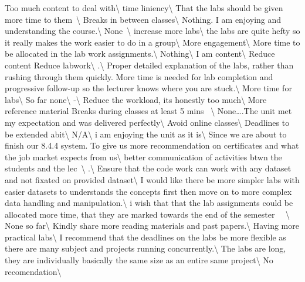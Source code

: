 \documentclass[
]{article}
\begin{document}
\hline Too much content to deal with\textbackslash{} \hline time
liniency\textbackslash{} \hline That the labs should be given more time
to them~\textbackslash{} \hline Breaks in between
classes\textbackslash{} \hline Nothing. I am enjoying and understanding
the course.\textbackslash{} \hline None~\textbackslash{} \hline increase
more labs\textbackslash{} \hline the labs are quite hefty so it really
makes the work easier to do in a group\textbackslash{} \hline More
engagement\textbackslash{} \hline More time to be allocated in the lab
work assignments.\textbackslash{} \hline Nothing\textbackslash{} \hline
I am content\textbackslash{} \hline Reduce content Reduce
labwork\textbackslash{} \hline .\textbackslash{} \hline Proper detailed
explanation of the labs, rather than rushing through them quickly. More
time is needed for lab completion and progressive follow-up so the
lecturer knows where you are stuck.\textbackslash{} \hline More time for
labs\textbackslash{} \hline So far none\textbackslash{} \hline
-\textbackslash{} \hline Reduce the workload, its honestly too
much\textbackslash{} \hline More reference material Breaks during
classes at least 5 mins ~\textbackslash{} \hline None\ldots.The unit met
my expectation and was delivered perfectly\textbackslash{} \hline Avoid
online classes\textbackslash{} \hline Deadlines to be extended
abit\textbackslash{} \hline N/A\textbackslash{} \hline i am enjoying the
unit as it is\textbackslash{} \hline Since we are about to finish our
8.4.4 system. To give us more recommendation on certificates and what
the job market expects from us\textbackslash{} \hline better
communication of activities btwn the students and the
lec~\textbackslash{} \hline .\textbackslash{} \hline Ensure that the
code work can work with any dataset and not fixated on provided
dataset\textbackslash{} \hline I would like there be more simpler labs
with easier datasets to understands the concepts first then move on to
more complex data handling and manipulation.\textbackslash{} \hline i
wish that that the lab assignments could be allocated more time, that
they are marked towards the end of the semester~ ~\textbackslash{}
\hline None so far\textbackslash{} \hline Kindly share more reading
materials and past papers.\textbackslash{} \hline Having more practical
labs\textbackslash{} \hline I recommend that the deadlines on the labs
be more flexible as there are many subject and projects running
concurrently.\textbackslash{} \hline The labs are long, they are
individually basically the same size as an entire same
project\textbackslash{} \hline No recomendation\textbackslash{} \hline
\end{document}
